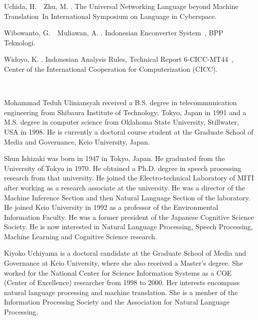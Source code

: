 \documentclass[english]{nlp}
\begin{document}
\begin{thebibliography}{}
Uchida, H.\BBACOMMA\  \BBA\ Zhu, M. \BBCP.
\newblock \BBOQ The Universal Networking Language beyond Machine
  Translation\BBCQ\
\newblock In {\Bem International Symposium on Language in Cyberspace}.

Wibowanto, G.\BBACOMMA\  \BBA\ Muliawan, A. \BBOP 1999\BBCP.
\newblock \BBOQ Indonesian Enconverter System\BBCQ\
\newblock \BTR, BPP Teknologi.

Widoyo, K. \BBOP 1995\BBCP.
\newblock \BBOQ Indonesian Analysis Rules, Technical Report 6-CICC-MT44\BBCQ\
\newblock \BTR, Center of the International Cooperation for Computerization
  (CICC).

\end{thebibliography}
~\\

\begin{biography}
{
Mohammad Teduh Uliniansyah received a B.S. degree in 
telecommunication engineering from Shibaura Institute of
Technology, Tokyo, Japan in 1991 and a M.S. degree in 
computer science from Oklahoma State University, Stillwater,
USA in 1998.
He is currently a doctoral course student at the Graduate School of
Media and Governance, Keio University, Japan.
}

\bioauthor{Shun Ishizaki}
{
Shun Ishizaki was born in 1947 in Tokyo, Japan. He graduated from
the University of Tokyo in 1970. He obtained a Ph.D. degree in speech
processing research from that university. He joined the Electro-technical
Laboratory of MITI after working as a research associate at the
university.
He was a director of the Machine Inference Section and then Natural 
Language Section of the laboratory. He joined Keio University in 1992
as a professor of the Environmental Information Faculty. He was a former
president of the Japanese Cognitive Science Society. He is now interested
in Natural Language Processing, Speech Processing, Machine Learning
and Cognitive Science research.
}

\bioauthor{Kiyoko Uchiyama}
{
Kiyoko Uchiyama is a doctoral candidate at the Graduate School of
Media and Governance at Keio University, where she also received a
Master's degree. She worked for the National Center for Science
Information Systems as a COE (Center of Excellence) researcher from
1998 to 2000. Her interests encompass natural language processing and
machine translation. She is a menber of the Information Processing
Society and the Association for Natural Language Processing.
}

\end{biography}
\end{document}
